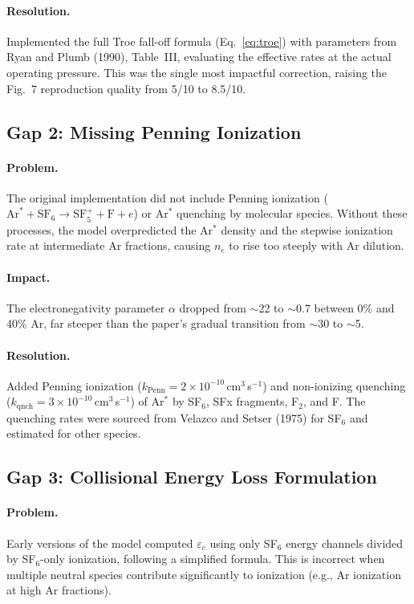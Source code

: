 \documentclass[11pt,a4paper]{article}
\newcommand{\SFsix}{\mathrm{SF}_6}
\newcommand{\SFfive}{\mathrm{SF}_5}
\newcommand{\Ar}{\mathrm{Ar}}
\newcommand{\ne}{n_e}
\begin{document}
\paragraph{Resolution.} Implemented the full Troe fall-off formula (Eq.~\ref{eq:troe}) with parameters from Ryan and Plumb (1990), Table~III, evaluating the effective rates at the actual operating pressure.  This was the single most impactful correction, raising the Fig.~7 reproduction quality from 5/10 to 8.5/10.

\subsection{Gap 2: Missing Penning Ionization}

\paragraph{Problem.} The original implementation did not include Penning ionization ($\Ar^* + \SFsix \to \SFfive^+ + \mathrm{F} + e$) or Ar$^*$ quenching by molecular species.  Without these processes, the model overpredicted the Ar$^*$ density and the stepwise ionization rate at intermediate Ar fractions, causing $\ne$ to rise too steeply with Ar dilution.

\paragraph{Impact.} The electronegativity parameter $\alpha$ dropped from $\sim$22 to $\sim$0.7 between 0\% and 40\% Ar, far steeper than the paper's gradual transition from $\sim$30 to $\sim$5.

\paragraph{Resolution.} Added Penning ionization ($k_\mathrm{Penn} = 2 \times 10^{-10}$\,cm$^3$\,s$^{-1}$) and non-ionizing quenching ($k_\mathrm{qnch} = 3 \times 10^{-10}$\,cm$^3$\,s$^{-1}$) of Ar$^*$ by SF$_6$, SFx fragments, F$_2$, and F.  The quenching rates were sourced from Velazco and Setser (1975) for SF$_6$ and estimated for other species.

\subsection{Gap 3: Collisional Energy Loss Formulation}

\paragraph{Problem.} Early versions of the model computed $\varepsilon_c$ using only SF$_6$ energy channels divided by SF$_6$-only ionization, following a simplified formula.  This is incorrect when multiple neutral species contribute significantly to ionization (e.g., Ar ionization at high Ar fractions).
\end{document}
